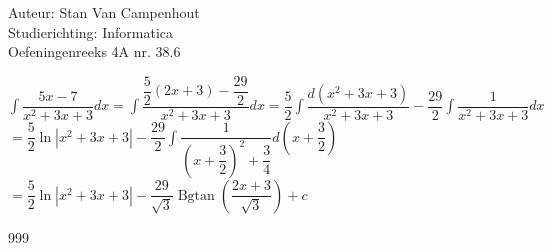 \documentclass[a4paper]{article}
\begin{document}
  
\noindent \large Auteur: Stan Van Campenhout \\
\noindent \large Studierichting:  Informatica\\
\noindent \large Oefeningenreeks 4A nr. 38.6\\

\medskip

\normalsize

$ \displaystyle\int\dfrac{5x-7}{x^2+3x+3}dx = \displaystyle\int\dfrac{\dfrac{5}{2}\left(2x+3\right)-\dfrac{29}{2}}{x^2+3x+3}dx 
= \dfrac{5}{2}\displaystyle\int\dfrac{d\left(x^2+3x+3\right)}{x^2+3x+3} -\dfrac{29}{2}\displaystyle\int\dfrac{1}{x^2+3x+3}dx $\\

$ = \dfrac{5}{2}\ln|x^2+3x+3| -\dfrac{29}{2}\displaystyle\int\dfrac{1}{\left(x+\dfrac{3}{2}\right)^2+\dfrac{3}{4}}d\left(x+\dfrac{3}{2}\right) $\\

$ = \dfrac{5}{2}\ln|x^2+3x+3| - \dfrac{29}{\sqrt{3}}\operatorname{Bgtan}\left(\dfrac{2x+3}{\sqrt{3}}\right) + c $\\

\begin{thebibliography}{999}
\end{thebibliography}
\end{document}
